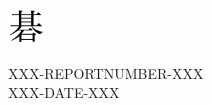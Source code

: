\documentclass[11pt]{article}
\begin{document}
\vbox{}
\vskip60mm
\begin{sideways}
\begin{minipage}[t]{10mm}
\includegraphics[width=10mm]{demo-stamp-left-logo.png}
\end{minipage}
\begin{minipage}[t]{100mm}
\vbox{}\vskip-10mm
XXX-REPORTNUMBER-XXX\\
\small
XXX-DATE-XXX
\end{minipage}
\end{sideways}
\vfill
\end{document}
